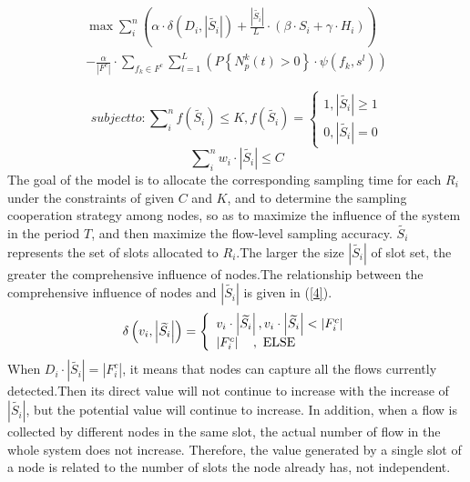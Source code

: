 \documentclass[conference]{IEEEtran}
\begin{document}
\begin{equation}
\begin{split}
\max \sum\limits_{i}^{n}{(\alpha \cdot {\delta ({{D}_{i}},\left| \widetilde{{{S}_{i}}} \right|)}+\frac{\left| \widetilde{{{S}_{i}}} \right|}{L\;}\cdot (\beta \cdot {{S}_{i}}+\gamma \cdot {{H}_{i}}))}  \\
-\frac{\alpha }{\left| {{F}^{c}} \right|}\cdot \sum\limits_{{{f}_{k}}\in {{F}^{c}}}{\sum\limits_{l=1}^{L\;}{\left( P\left\{ N_{p}^{k}\left( t \right)>0 \right\}\cdot \psi \left( {{f}_{k}},{{s}^{l}} \right) \right)}} \label{1}
\end{split}
\end{equation}

\begin{equation}
subject to: \sum\nolimits_i^n {f(\widetilde {{S_i}}) \le } K,f(\widetilde {{S_i}}) = \left\{ \begin{array}{l}
1,\left| {\widetilde {{S_i}}} \right| \ge 1\\
0,\left| {\widetilde {{S_i}}} \right| = 0
\end{array} \right.\label{2}
\end{equation}
\begin{equation}
\sum\nolimits_{i}^{n}{{{w}_{i}}\cdot \left| \widetilde{{{S}_{i}}} \right|\le C}\label{3}
\end{equation}
The goal of the model is to allocate the corresponding sampling time for each $R_i$ under the constraints of given $C$ and $K$, and to determine the sampling cooperation strategy among nodes, so as to maximize the influence of the system in the period $T$, and then maximize the flow-level sampling accuracy. $\widetilde{{{S}_{i}}}$ represents the set of slots allocated to $R_i$.The larger the size $|\widetilde{{{S}_{i}}}|$ of slot set, the greater the comprehensive influence of nodes.The relationship between the comprehensive influence of nodes and $|\widetilde{{{S}_{i}}}|$ is given in (\ref{4}).
\begin{equation}
\delta \left( {{v_i},\left| {\widetilde {{S_i}}} \right|} \right) = \left\{ \begin{array}{l}
{v_i} \cdot \left| {\widetilde {{S_i}}} \right|,{\rm{    }}{v_i} \cdot \left| {\widetilde {{S_i}}} \right| < \left| {F_i^c} \right|\\
\left| {F_i^c} \right|{\rm{   }}\quad,\ {\rm{    ELSE}}
\end{array} \right.\label{4}
\end{equation}
When $ D_i\cdot |\widetilde{{{S}_{i}}}|=|F^c_i|$, it means that nodes can capture all the flows currently detected.Then its direct value will not continue to increase with the increase of $|\widetilde{{{S}_{i}}}|$, but the potential value will continue to increase. In addition, when a flow is collected by different nodes in the same slot, the actual number of flow in the whole system does not increase. Therefore, the value generated by a single slot of a node is related to the number of slots the node already has, not independent.
\end{document}
